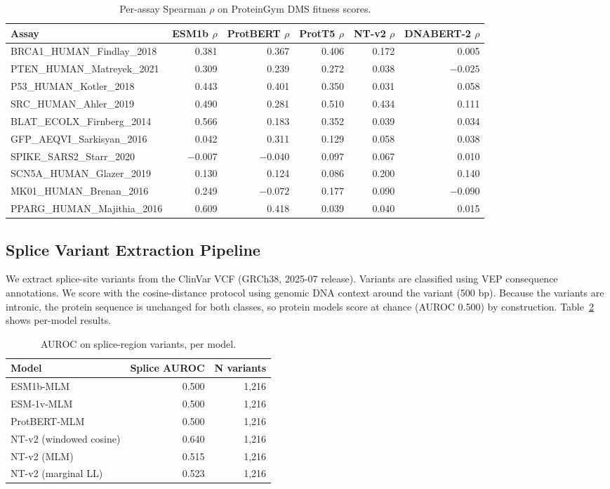 \documentclass[9pt]{article}
\begin{document}
\begin{table}[h]
\centering
\caption{Per-assay Spearman $\rho$ on ProteinGym DMS fitness scores.}
\label{tab:proteingym_full}
\small
\begin{tabular}{lrrrrr}
\toprule
\textbf{Assay} & \textbf{ESM1b $\rho$} & \textbf{ProtBERT $\rho$} & \textbf{ProtT5 $\rho$} & \textbf{NT-v2 $\rho$} & \textbf{DNABERT-2 $\rho$} \\
\midrule
BRCA1\_HUMAN\_Findlay\_2018 & 0.381 & 0.367 & 0.406 & 0.172 & 0.005 \\
PTEN\_HUMAN\_Matreyek\_2021 & 0.309 & 0.239 & 0.272 & 0.038 & $-0.025$ \\
P53\_HUMAN\_Kotler\_2018 & 0.443 & 0.401 & 0.350 & 0.031 & 0.058 \\
SRC\_HUMAN\_Ahler\_2019 & 0.490 & 0.281 & 0.510 & 0.434 & 0.111 \\
BLAT\_ECOLX\_Firnberg\_2014 & 0.566 & 0.183 & 0.352 & 0.039 & 0.034 \\
GFP\_AEQVI\_Sarkisyan\_2016 & 0.042 & 0.311 & 0.129 & 0.058 & 0.038 \\
SPIKE\_SARS2\_Starr\_2020 & $-0.007$ & $-0.040$ & 0.097 & 0.067 & 0.010 \\
SCN5A\_HUMAN\_Glazer\_2019 & 0.130 & 0.124 & 0.086 & 0.200 & 0.140 \\
MK01\_HUMAN\_Brenan\_2016 & 0.249 & $-0.072$ & 0.177 & 0.090 & $-0.090$ \\
PPARG\_HUMAN\_Majithia\_2016 & 0.609 & 0.418 & 0.039 & 0.040 & 0.015 \\
\bottomrule
\end{tabular}
\end{table}

\subsection{Splice Variant Extraction Pipeline}

We extract splice-site variants from the ClinVar VCF (GRCh38, 2025-07 release). Variants are classified using VEP consequence annotations. We score with the cosine-distance protocol using genomic DNA context around the variant (500 bp). Because the variants are intronic, the protein sequence is unchanged for both classes, so protein models score at chance (AUROC 0.500) by construction. Table~\ref{tab:splice_full} shows per-model results.

\begin{table}[h]
\centering
\caption{AUROC on splice-region variants, per model.}
\label{tab:splice_full}
\small
\begin{tabular}{lrr}
\toprule
\textbf{Model} & \textbf{Splice AUROC} & \textbf{N variants} \\
\midrule
ESM1b-MLM & 0.500 & 1,216 \\
ESM-1v-MLM & 0.500 & 1,216 \\
ProtBERT-MLM & 0.500 & 1,216 \\
NT-v2 (windowed cosine) & 0.640 & 1,216 \\
NT-v2 (MLM) & 0.515 & 1,216 \\
NT-v2 (marginal LL) & 0.523 & 1,216 \\
\bottomrule
\end{tabular}
\end{table}
\end{document}
